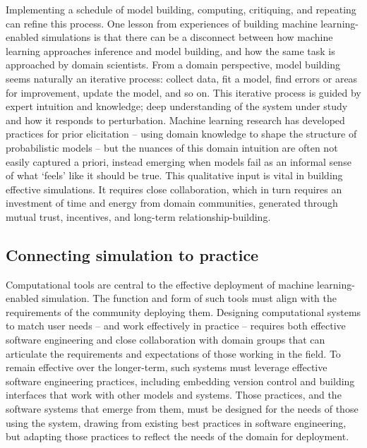 Implementing a schedule of model building, computing, critiquing, and
repeating can refine this process. One lesson from experiences of
building machine learning-enabled simulations is that there can be a
disconnect between how machine learning approaches inference and model
building, and how the same task is approached by domain scientists. From
a domain perspective, model building seems naturally an iterative
process: collect data, fit a model, find errors or areas for
improvement, update the model, and so on. This iterative process is
guided by expert intuition and knowledge; deep understanding of the
system under study and how it responds to perturbation. Machine learning
research has developed practices for prior elicitation -- using domain
knowledge to shape the structure of probabilistic models -- but the
nuances of this domain intuition are often not easily captured a priori,
instead emerging when models fail as an informal sense of what `feels'
like it should be true. This qualitative input is vital in building
effective simulations. It requires close collaboration, which in turn
requires an investment of time and energy from domain communities,
generated through mutual trust, incentives, and long-term
relationship-building.

\hypertarget{connecting-simulation-to-practice}{%
\subsection{Connecting simulation to
practice}\label{connecting-simulation-to-practice}}

Computational tools are central to the effective deployment of machine
learning-enabled simulation. The function and form of such tools must
align with the requirements of the community deploying them. Designing
computational systems to match user needs -- and work effectively in
practice -- requires both effective software engineering and close
collaboration with domain groups that can articulate the requirements
and expectations of those working in the field. To remain effective over
the longer-term, such systems must leverage effective software
engineering practices, including embedding version control and building
interfaces that work with other models and systems. Those practices, and
the software systems that emerge from them, must be designed for the
needs of those using the system, drawing from existing best practices in
software engineering, but adapting those practices to reflect the needs
of the domain for deployment.

